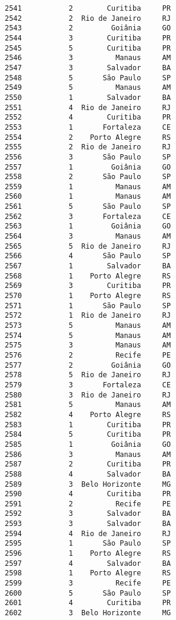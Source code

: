 \documentclass[11pt]{article}
\begin{document}
\begin{Verbatim}[commandchars=\\\{\}]
2541           2        Curitiba     PR  
2542           2  Rio de Janeiro     RJ  
2543           2         Goiânia     GO  
2544           3        Curitiba     PR  
2545           5        Curitiba     PR  
2546           3          Manaus     AM  
2547           3        Salvador     BA  
2548           5       São Paulo     SP  
2549           5          Manaus     AM  
2550           1        Salvador     BA  
2551           4  Rio de Janeiro     RJ  
2552           4        Curitiba     PR  
2553           1       Fortaleza     CE  
2554           2    Porto Alegre     RS  
2555           2  Rio de Janeiro     RJ  
2556           3       São Paulo     SP  
2557           1         Goiânia     GO  
2558           2       São Paulo     SP  
2559           1          Manaus     AM  
2560           1          Manaus     AM  
2561           5       São Paulo     SP  
2562           3       Fortaleza     CE  
2563           1         Goiânia     GO  
2564           3          Manaus     AM  
2565           5  Rio de Janeiro     RJ  
2566           4       São Paulo     SP  
2567           1        Salvador     BA  
2568           1    Porto Alegre     RS  
2569           3        Curitiba     PR  
2570           1    Porto Alegre     RS  
2571           1       São Paulo     SP  
2572           1  Rio de Janeiro     RJ  
2573           5          Manaus     AM  
2574           5          Manaus     AM  
2575           3          Manaus     AM  
2576           2          Recife     PE  
2577           2         Goiânia     GO  
2578           5  Rio de Janeiro     RJ  
2579           3       Fortaleza     CE  
2580           3  Rio de Janeiro     RJ  
2581           5          Manaus     AM  
2582           4    Porto Alegre     RS  
2583           1        Curitiba     PR  
2584           5        Curitiba     PR  
2585           1         Goiânia     GO  
2586           3          Manaus     AM  
2587           2        Curitiba     PR  
2588           4        Salvador     BA  
2589           3  Belo Horizonte     MG  
2590           4        Curitiba     PR  
2591           2          Recife     PE  
2592           3        Salvador     BA  
2593           3        Salvador     BA  
2594           4  Rio de Janeiro     RJ  
2595           1       São Paulo     SP  
2596           1    Porto Alegre     RS  
2597           4        Salvador     BA  
2598           1    Porto Alegre     RS  
2599           3          Recife     PE  
2600           5       São Paulo     SP  
2601           4        Curitiba     PR  
2602           3  Belo Horizonte     MG  

\end{Verbatim}
\end{document}
